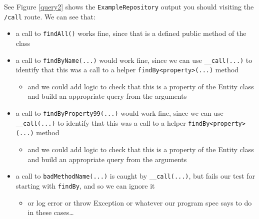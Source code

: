 \documentclass[a4paperpaper,openright]{book}
\providecommand{\tightlist}{%
  \setlength{\itemsep}{0pt}\setlength{\parskip}{0pt}}
\begin{document}
See Figure \ref{query2} shows the \texttt{ExampleRepository} output you
should visiting the \texttt{/call} route. We can see that:

\begin{itemize}
\item
  a call to \texttt{findAll()} works fine, since that is a defined
  public method of the class
\item
  a call to \texttt{findByName(...)} would work fine, since we can use
  \texttt{\_\_call(...)} to identify that this was a call to a helper
  \texttt{findBy\textless{}property\textgreater{}(...)} method

  \begin{itemize}
  \tightlist
  \item
    and we could add logic to check that this is a property of the
    Entity class and build an appropriate query from the arguments
  \end{itemize}
\item
  a call to \texttt{findByProperty99(...)} would work fine, since we can
  use \texttt{\_\_call(...)} to identify that this was a call to a
  helper \texttt{findBy\textless{}property\textgreater{}(...)} method

  \begin{itemize}
  \tightlist
  \item
    and we could add logic to check that this is a property of the
    Entity class and build an appropriate query from the arguments
  \end{itemize}
\item
  a call to \texttt{badMethodName(...)} is caught by
  \texttt{\_\_call(...)}, but fails our test for starting with
  \texttt{findBy}, and so we can ignore it

  \begin{itemize}
  \tightlist
  \item
    or log error or throw Exception or whatever our program spec says to
    do in these cases\ldots{}
  \end{itemize}
\end{itemize}
\end{document}
